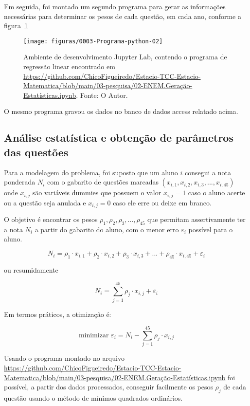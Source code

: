 \documentclass[
	article,			%
	11pt,				%
	oneside,			%
	a4paper,			%
	english,			%
	brazil,				%
	sumario=tradicional
]{abntex2}
\begin{document}
			Em seguida, foi montado um segundo programa para gerar as informações necessárias para determinar os pesos de cada questão, em cada ano, conforme a figura~\ref{fig:0003-programa-python-02}
			
			\begin{figure}[H]
				\centering
				\texttt{[image: figuras/0003-Programa-python-02]}
				\caption[Ambiente de desenvolvimento Jupyter Lab, contendo o programa encontrado em]{Ambiente de desenvolvimento Jupyter Lab, contendo o programa de regressão linear encontrado em \url{https://github.com/ChicoFigueiredo/Estacio-TCC-Estacio-Matematica/blob/main/03-pesquisa/02-ENEM.Geração-Estatísticas.ipynb}. Fonte: O Autor.}
				\label{fig:0003-programa-python-02}
			\end{figure}
			
			O mesmo programa gravou os dados no banco de dados access relatado acima.
			

		\subsection{Análise estatística e obtenção de parâmetros das questões}
			
			Para a modelagem do problema, foi suposto que um aluno $i$ consegui a nota ponderada $N_i$ com o gabarito de questões marcadas $( x_{i,1}, x_{i,2}, x_{i,3}, ..., x_{i,45} )$ onde $x_{i,j}$ são variáveis dummies que possuem o valor $x_{i,j} = 1$ caso o aluno acerte ou a questão seja anulada e $x_{i,j} = 0$ caso ele erre ou deixe em branco.
			
			O objetivo é encontrar os pesos $\rho_1,\rho_2,\rho_3,...,\rho_{45}$ que permitam assertivamente ter a nota $N_i$ a partir do gabarito do aluno, com o menor erro $\varepsilon_i$ possível para o aluno.
			
			
			\[  N_i = \rho_1 \cdot x_{i,1} + \rho_2 \cdot x_{i,2} + \rho_3 \cdot x_{i,3} + ... + \rho_{45} \cdot x_{i,45} + \varepsilon_i \]

			 ou resumidamente

			\[ N_i = \sum_{j=1}^{45} \rho_j \cdot x_{i,j}  + \varepsilon_i   \]
							
			Em termos práticos, a otimização é:

			\[ \text{minimizar  } \varepsilon_i = N_i - \sum_{j=1}^{45} \rho_j \cdot x_{i,j}   \]
				
			Usando o programa montado no arquivo \url{https://github.com/ChicoFigueiredo/Estacio-TCC-Estacio-Matematica/blob/main/03-pesquisa/02-ENEM.Geração-Estatísticas.ipynb} foi possível, a partir dos dados processados, conseguir facilmente os pesos $\rho_j$ de cada questão usando o método de mínimos quadrados ordinários.
			
\end{document}

